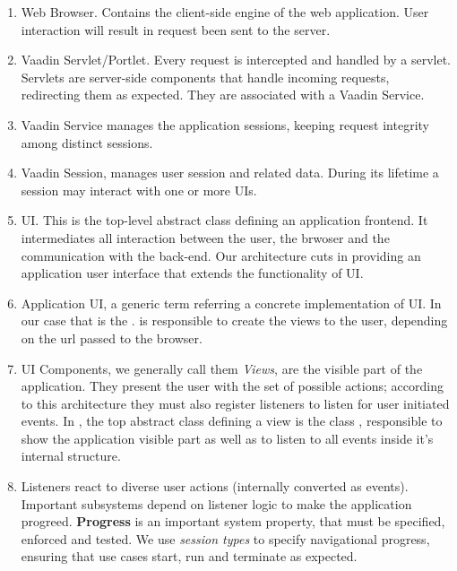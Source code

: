 \begin{enumerate}
\item Web Browser. Contains the client-side engine of the web
  application. User interaction will result in request been sent to
  the server.

\item Vaadin Servlet/Portlet. Every request is intercepted and handled
  by a servlet. Servlets are server-side components that handle
  incoming requests, redirecting them as expected. They are associated
  with a Vaadin Service.

\item Vaadin Service manages the application sessions, keeping request
  integrity among distinct sessions.

\item Vaadin Session, manages user session and related data. During
  its lifetime a session may interact with one or more UIs.

\item UI. This is the top-level abstract class defining an application
  frontend. It intermediates all interaction between the user, the
  brwoser and the communication with the back-end. Our architecture
  cuts in providing an application user interface that extends the
  functionality of UI.

\item Application UI, a generic term referring a concrete
  implementation of UI. In our case that is the
  .  is responsible to create the
  views to the user, depending on the url passed to the browser.

\item UI Components, we generally call them \emph{Views}, are the
  visible part of the application. They present the user with the set
  of possible actions; according to this architecture they must also
  register listeners to listen for user initiated events. In
  \lifetime, the top abstract class defining a view is the class
  , responsible to show the application visible
  part as well as to listen to all events inside it's internal
  structure.

\item Listeners react to diverse user actions (internally converted as
  events). Important subsystems depend on listener logic to make the
  application progreed. \textbf{Progress} is an important system
  property, that must be specified, enforced and tested. We use
  \emph{session types} to specify navigational progress, ensuring that
  use cases start, run and terminate as expected.


\end{enumerate}
